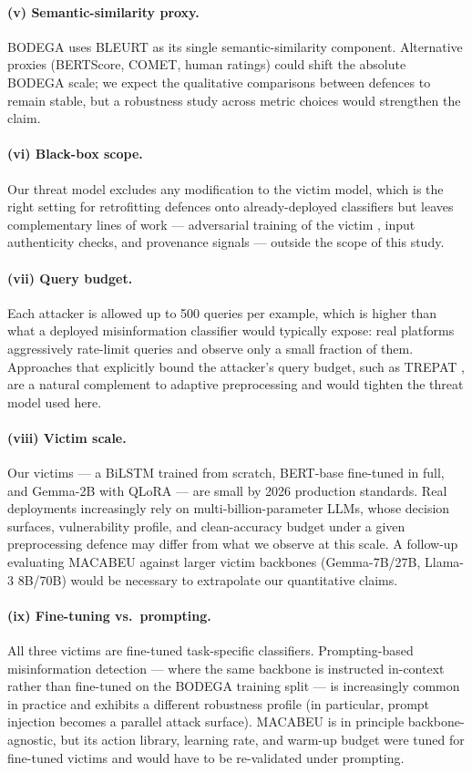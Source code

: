 \documentclass[11pt]{article}
\begin{document}
\paragraph{(v) Semantic-similarity proxy.} BODEGA uses BLEURT \citep{Sellam2020} as its single semantic-similarity component. Alternative proxies (BERTScore, COMET, human ratings) could shift the absolute BODEGA scale; we expect the qualitative comparisons between defences to remain stable, but a robustness study across metric choices would strengthen the claim.

\paragraph{(vi) Black-box scope.} Our threat model excludes any modification to the victim model, which is the right setting for retrofitting defences onto already-deployed classifiers but leaves complementary lines of work --- adversarial training of the victim \citep{Madry2018, Miyato2017advtrain}, input authenticity checks, and provenance signals --- outside the scope of this study.

\paragraph{(vii) Query budget.} Each attacker is allowed up to 500 queries per example, which is higher than what a deployed misinformation classifier would typically expose: real platforms aggressively rate-limit queries and observe only a small fraction of them. Approaches that explicitly bound the attacker's query budget, such as TREPAT \citep{Przybyla2025LLMattack}, are a natural complement to adaptive preprocessing and would tighten the threat model used here.

\paragraph{(viii) Victim scale.} Our victims --- a BiLSTM trained from scratch, BERT-base fine-tuned in full, and Gemma-2B with QLoRA --- are small by 2026 production standards. Real deployments increasingly rely on multi-billion-parameter LLMs, whose decision surfaces, vulnerability profile, and clean-accuracy budget under a given preprocessing defence may differ from what we observe at this scale. A follow-up evaluating MACABEU against larger victim backbones (Gemma-7B/27B, Llama-3 8B/70B) would be necessary to extrapolate our quantitative claims.

\paragraph{(ix) Fine-tuning vs.\ prompting.} All three victims are fine-tuned task-specific classifiers. Prompting-based misinformation detection --- where the same backbone is instructed in-context rather than fine-tuned on the BODEGA training split --- is increasingly common in practice and exhibits a different robustness profile (in particular, prompt injection becomes a parallel attack surface). MACABEU is in principle backbone-agnostic, but its action library, learning rate, and warm-up budget were tuned for fine-tuned victims and would have to be re-validated under prompting.
\end{document}
